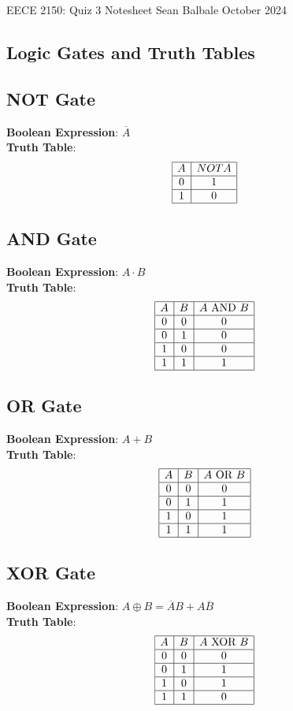 \documentclass[10pt]{article}
\begin{document}
EECE 2150: Quiz 3 Notesheet \hfill Sean Balbale \hfill October 2024

\begin{multicols}{3}
\section{Logic Gates and Truth Tables}
\subsection{NOT Gate}
\textbf{Boolean Expression}: \( \overline{A} \) \\
\textbf{Truth Table}:
\[
\begin{array}{|c|c|}
\hline
A & NOT A \\
\hline
0 & 1 \\\hline
1 & 0 \\\hline
\end{array}
\]
\subsection{AND Gate}
\textbf{Boolean Expression}: \( A \cdot B \) \\
\textbf{Truth Table}:
\[
\begin{array}{|c|c|c|}
\hline
A & B & A \text{ AND } B \\
\hline
0 & 0 & 0 \\\hline
0 & 1 & 0 \\\hline
1 & 0 & 0 \\\hline
1 & 1 & 1 \\\hline
\end{array}
\]

\subsection{OR Gate}
\textbf{Boolean Expression}: \( A + B \) \\
\textbf{Truth Table}:
\[
\begin{array}{|c|c|c|}
\hline
A & B & A \text{ OR } B \\
\hline
0 & 0 & 0 \\\hline
0 & 1 & 1 \\\hline
1 & 0 & 1 \\\hline
1 & 1 & 1 \\\hline
\end{array}
\]

\subsection{XOR Gate}
\textbf{Boolean Expression}: \( A \oplus B = \overline{A}B + A\overline{B}\) \\
\textbf{Truth Table}:
\[
\begin{array}{|c|c|c|}
\hline
A & B & A \text{ XOR } B \\
\hline
0 & 0 & 0 \\\hline
0 & 1 & 1 \\\hline
1 & 0 & 1 \\\hline
1 & 1 & 0 \\\hline
\end{array}
\]


\end{multicols}
\end{document}
